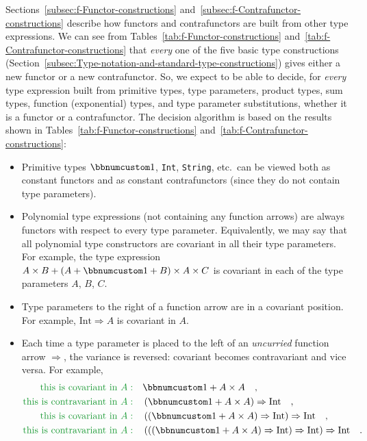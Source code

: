 Sections~\ref{subsec:f-Functor-constructions} and~\ref{subsec:f-Contrafunctor-constructions}
describe how functors and contrafunctors are built from other type
expressions. We can see from Tables~\ref{tab:f-Functor-constructions}
and~\ref{tab:f-Contrafunctor-constructions} that \emph{every} one
of the five basic type constructions (Section~\ref{subsec:Type-notation-and-standard-type-constructions})
gives either a new functor or a new contrafunctor. So, we expect to
be able to decide, for \emph{every} type expression built from primitive
types, type parameters, product types, sum types, function (exponential)
types, and type parameter substitutions, whether it is a functor or
a contrafunctor. The decision algorithm is based on the results shown
in Tables~\ref{tab:f-Functor-constructions} and~\ref{tab:f-Contrafunctor-constructions}:
\begin{itemize}
\item Primitive types $\bbnum 1$, \lstinline!Int!, \lstinline!String!,
etc.~can be viewed both as constant functors and as constant contrafunctors
(since they do not contain type parameters).
\item Polynomial type expressions (not containing any function arrows) are
always functors with respect to every type
parameter. Equivalently, we may say that all polynomial type constructors
are covariant in all their type parameters. For example, the type
expression $A\times B+\left(A+\bbnum 1+B\right)\times A\times C$
is covariant in each of the type parameters $A$, $B$, $C$.
\item Type parameters to the right of a function arrow are in a covariant
position. For example, $\text{Int}\Rightarrow A$ is covariant in
$A$.
\item Each time a type parameter is placed to the left of an \emph{uncurried}
function arrow $\Rightarrow$, the variance is reversed: covariant
becomes contravariant and vice versa. For example,
\begin{align*}
{\color{greenunder}\text{this is covariant in }A:}\quad & \bbnum 1+A\times A\quad,\\
{\color{greenunder}\text{this is contravariant in }A:}\quad & \left(\bbnum 1+A\times A\right)\Rightarrow\text{Int}\quad,\\
{\color{greenunder}\text{this is covariant in }A:}\quad & \left(\left(\bbnum 1+A\times A\right)\Rightarrow\text{Int}\right)\Rightarrow\text{Int}\quad,\\
{\color{greenunder}\text{this is contravariant in }A:}\quad & \left(\left(\left(\bbnum 1+A\times A\right)\Rightarrow\text{Int}\right)\Rightarrow\text{Int}\right)\Rightarrow\text{Int}\quad.

\end{align*}
\end{itemize}
